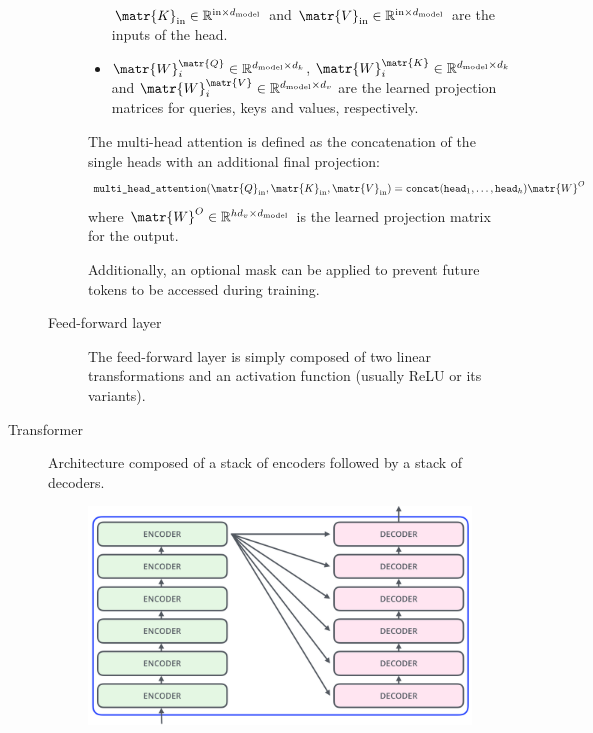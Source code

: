 \begin{description}
\begin{description}
\begin{itemize}
                        $\matr{K}_\text{in} \in \mathbb{R}^{\text{in} \times d_{\text{model}}}$ and 
                        $\matr{V}_\text{in} \in \mathbb{R}^{\text{in} \times d_{\text{model}}}$ are the inputs of the head.
                    \item $\matr{W}_{i}^\matr{Q} \in \mathbb{R}^{d_{\text{model}} \times d_k}$, 
                        $\matr{W}_{i}^\matr{K} \in \mathbb{R}^{d_{\text{model}} \times d_k}$ and 
                        $\matr{W}_{i}^\matr{V} \in \mathbb{R}^{d_{\text{model}} \times d_v}$ are the learned projection matrices for queries, keys and values, respectively.
                \end{itemize} 

                The multi-head attention is defined as the concatenation of the single heads with an additional final projection:
                \begin{equation*}
                    \texttt{multi\_head\_attention}(\matr{Q}_\text{in}, \matr{K}_\text{in}, \matr{V}_\text{in}) = 
                        \texttt{concat}(\texttt{head}_{1}, \dots, \texttt{head}_{h}) \matr{W}^{O}
                \end{equation*}
                where $\matr{W}^O \in \mathbb{R}^{hd_v \times d_{\text{model}}}$ is the learned projection matrix for the output.
                
                Additionally, an optional mask can be applied to prevent future tokens to be accessed during training.

            \item[Feed-forward layer] 
                The feed-forward layer is simply composed of two linear transformations and an activation function (usually ReLU or its variants).
        \end{description}

    \item[Transformer] 
        Architecture composed of a stack of encoders followed by a stack of decoders.

        \begin{figure}[H]
            \centering
            \includegraphics[width=0.35\linewidth]{./img/transformer_structure.png}
        \end{figure}


\end{description}
